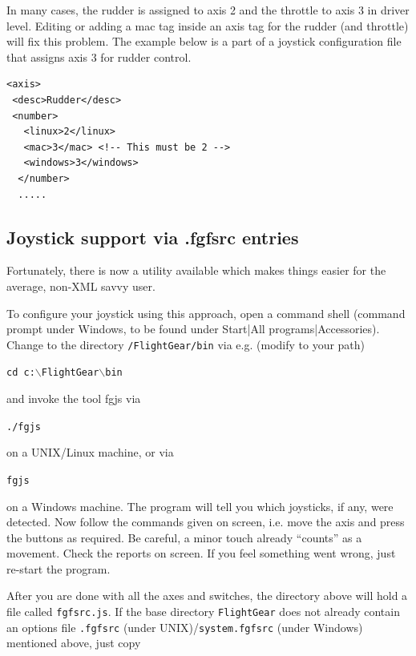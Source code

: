 In many cases, the rudder is assigned to axis 2 and the throttle to axis 3 in driver level. Editing or adding a mac tag inside an axis tag for the rudder (and throttle) will fix this problem. The example below is a part of a joystick configuration file that assigns axis 3 for rudder control. 

\begin{verbatim}
<axis>
 <desc>Rudder</desc>
 <number>
   <linux>2</linux>
   <mac>3</mac> <!-- This must be 2 -->
   <windows>3</windows>
  </number>
  .....
\end{verbatim}

\subsection{Joystick support via .fgfsrc entries\label{fgfsrcjoy}}
Fortunately, there is now a utility available which makes things easier for the average, non-XML savvy user.

To configure your joystick using this approach, open a command shell (command prompt under Windows, to be found under Start|All programs|Accessories). Change to the directory \texttt{/FlightGear/bin} via e.g. (modify to your path)

\noindent
\texttt{cd c:$\backslash$FlightGear$\backslash$bin}

and invoke the tool fgjs via

\noindent
\texttt{./fgjs}

on a UNIX/Linux machine, or via

\noindent
\texttt{fgjs}

on a Windows machine. The program will tell you which joysticks, if any, were detected. Now follow the commands given on screen, i.e. move the axis and press the buttons as required. Be careful, a minor touch already ``counts'' as a movement. Check the reports on screen. If you feel something went wrong, just re-start the program.

After you are done with all the axes and switches, the directory above will hold a file called \texttt{fgfsrc.js}. If the \FlightGear{} base directory \texttt{FlightGear} does not already contain an options file \texttt{.fgfsrc} (under UNIX)/\texttt{system.fgfsrc} (under Windows) mentioned above, just copy
\medskip


